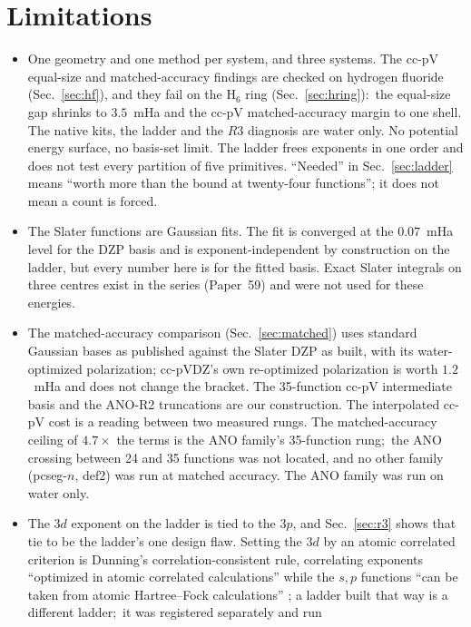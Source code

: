 \documentclass[aps,pra,twocolumn,superscriptaddress,longbibliography]{revtex4-2}
\begin{document}
\section{Limitations}
\label{sec:limits}

\begin{itemize}
\item One geometry and one method per system, and three systems.  The
cc-pV equal-size and matched-accuracy findings are checked on hydrogen
fluoride (Sec.~\ref{sec:hf}), and they fail on the H$_6$ ring
(Sec.~\ref{sec:hring}):\ the equal-size gap shrinks to $3.5$~mHa and the
cc-pV matched-accuracy margin to one shell.  The native kits, the ladder and the
$R3$ diagnosis are water only.  No potential energy surface, no basis-set
limit.  The ladder frees
exponents in one order and does not test every partition of five
primitives.  ``Needed'' in Sec.~\ref{sec:ladder} means ``worth more
than the bound at twenty-four functions''; it does not mean a count is
forced.
\item The Slater functions are Gaussian fits.  The fit is converged at
the $0.07$~mHa level for the DZP basis and is exponent-independent by
construction on the ladder, but every number here is for the fitted
basis.  Exact Slater integrals on three centres exist in the series
(Paper~59) and were not used for these energies.
\item The matched-accuracy comparison (Sec.~\ref{sec:matched}) uses
standard Gaussian bases as published against the Slater DZP as built,
with its water-optimized polarization; cc-pVDZ's own re-optimized
polarization is worth $1.2$~mHa and does not change the bracket.  The
35-function cc-pV intermediate basis and the ANO-R2 truncations are our
construction.  The interpolated cc-pV cost is a reading between two
measured rungs.  The matched-accuracy ceiling of $4.7\times$ the terms
is the ANO family's 35-function rung;\ the ANO crossing between 24 and 35
functions was not located, and no other family (pcseg-$n$, def2) was run
at matched accuracy.  The ANO family was run on water only.
\item The $3d$ exponent on the ladder is tied to the $3p$, and
Sec.~\ref{sec:r3} shows that tie to be the ladder's one design flaw.
Setting the $3d$ by an atomic correlated criterion is Dunning's
correlation-consistent rule, correlating exponents ``optimized in atomic
correlated calculations'' while the $s,p$ functions ``can be taken from
atomic Hartree--Fock calculations'' \cite{dunning1989}; a ladder built that
way is a different ladder;\ it was registered separately and run

\end{itemize}
\end{document}
